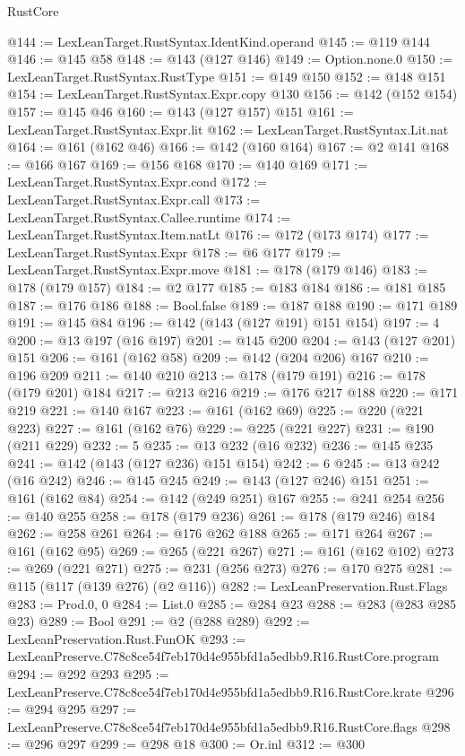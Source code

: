 \begin{lexlean}{RustCore}
\begin{coremodule}
@144 := LexLeanTarget.RustSyntax.IdentKind.operand
@145 := @119 @144
@146 := @145 @58
@148 := @143 (@127 @146)
@149 := Option.none.{0}
@150 := LexLeanTarget.RustSyntax.RustType
@151 := @149 @150
@152 := @148 @151
@154 := LexLeanTarget.RustSyntax.Expr.copy @130
@156 := @142 (@152 @154)
@157 := @145 @46
@160 := @143 (@127 @157) @151
@161 := LexLeanTarget.RustSyntax.Expr.lit
@162 := LexLeanTarget.RustSyntax.Lit.nat
@164 := @161 (@162 @46)
@166 := @142 (@160 @164)
@167 := @2 @141
@168 := @166 @167
@169 := @156 @168
@170 := @140 @169
@171 := LexLeanTarget.RustSyntax.Expr.cond
@172 := LexLeanTarget.RustSyntax.Expr.call
@173 := LexLeanTarget.RustSyntax.Callee.runtime
@174 := LexLeanTarget.RustSyntax.Item.natLt
@176 := @172 (@173 @174)
@177 := LexLeanTarget.RustSyntax.Expr
@178 := @6 @177
@179 := LexLeanTarget.RustSyntax.Expr.move
@181 := @178 (@179 @146)
@183 := @178 (@179 @157)
@184 := @2 @177
@185 := @183 @184
@186 := @181 @185
@187 := @176 @186
@188 := Bool.false
@189 := @187 @188
@190 := @171 @189
@191 := @145 @84
@196 := @142 (@143 (@127 @191) @151 @154)
@197 := 4
@200 := @13 @197 (@16 @197)
@201 := @145 @200
@204 := @143 (@127 @201) @151
@206 := @161 (@162 @58)
@209 := @142 (@204 @206) @167
@210 := @196 @209
@211 := @140 @210
@213 := @178 (@179 @191)
@216 := @178 (@179 @201) @184
@217 := @213 @216
@219 := @176 @217 @188
@220 := @171 @219
@221 := @140 @167
@223 := @161 (@162 @69)
@225 := @220 (@221 @223)
@227 := @161 (@162 @76)
@229 := @225 (@221 @227)
@231 := @190 (@211 @229)
@232 := 5
@235 := @13 @232 (@16 @232)
@236 := @145 @235
@241 := @142 (@143 (@127 @236) @151 @154)
@242 := 6
@245 := @13 @242 (@16 @242)
@246 := @145 @245
@249 := @143 (@127 @246) @151
@251 := @161 (@162 @84)
@254 := @142 (@249 @251) @167
@255 := @241 @254
@256 := @140 @255
@258 := @178 (@179 @236)
@261 := @178 (@179 @246) @184
@262 := @258 @261
@264 := @176 @262 @188
@265 := @171 @264
@267 := @161 (@162 @95)
@269 := @265 (@221 @267)
@271 := @161 (@162 @102)
@273 := @269 (@221 @271)
@275 := @231 (@256 @273)
@276 := @170 @275
@281 := @115 (@117 (@139 @276) (@2 @116))
@282 := LexLeanPreservation.Rust.Flags
@283 := Prod.{0, 0}
@284 := List.{0}
@285 := @284 @23
@288 := @283 (@283 @285 @23)
@289 := Bool
@291 := @2 (@288 @289)
@292 := LexLeanPreservation.Rust.FunOK
@293 := LexLeanPreserve.C78c8ce54f7eb170d4e955bfd1a5edbb9.R16.RustCore.program
@294 := @292 @293
@295 := LexLeanPreserve.C78c8ce54f7eb170d4e955bfd1a5edbb9.R16.RustCore.krate
@296 := @294 @295
@297 := LexLeanPreserve.C78c8ce54f7eb170d4e955bfd1a5edbb9.R16.RustCore.flags
@298 := @296 @297
@299 := @298 @18
@300 := Or.inl
@312 := @300

\end{coremodule}
\end{lexlean}
